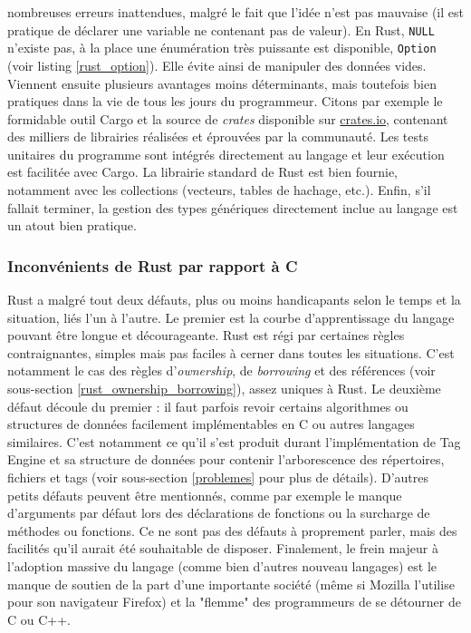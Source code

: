 nombreuses erreurs inattendues, malgré le fait que l'idée n'est pas mauvaise (il est pratique de 
déclarer une variable ne contenant pas de valeur). En Rust, \texttt{NULL} n'existe pas, à la 
place une énumération très puissante est disponible, \texttt{Option} (voir listing \ref{rust_option}).
Elle évite ainsi de manipuler des données vides.
\bigbreak
Viennent ensuite plusieurs avantages moins déterminants, mais toutefois bien pratiques dans la 
vie de tous les jours du programmeur. Citons par exemple le formidable outil Cargo et la source 
de \textit{crates} disponible sur \href{crates.io}{crates.io}, contenant des milliers de librairies 
réalisées et éprouvées par la communauté. Les tests unitaires du programme sont intégrés directement 
au langage et leur exécution est facilitée avec Cargo. La librairie standard de Rust est bien fournie,
notamment avec les collections (vecteurs, tables de hachage, etc.). Enfin, s'il fallait terminer, 
la gestion des types génériques directement inclue au langage est un atout bien pratique.

\subsubsection{Inconvénients de Rust par rapport à C}
Rust a malgré tout deux défauts, plus ou moins handicapants selon le temps et la situation, liés 
l'un à l'autre. Le premier est la courbe d'apprentissage du langage pouvant être longue et décourageante. 
Rust est régi par certaines règles contraignantes, simples mais pas faciles à cerner dans toutes 
les situations. C'est notamment le cas des règles d'\textit{ownership}, de \textit{borrowing} et 
des références (voir sous-section \ref{rust_ownership_borrowing}), assez uniques à Rust. 
Le deuxième défaut découle du premier : il faut parfois revoir certains algorithmes ou structures 
de données facilement implémentables en C ou autres langages similaires. C'est notamment ce qu'il 
s'est produit durant l'implémentation de Tag Engine et sa structure de données pour contenir 
l'arborescence des répertoires, fichiers et tags (voir sous-section \ref{problemes} pour plus de détails).
D'autres petits défauts peuvent être mentionnés, comme par exemple le manque d'arguments par défaut 
lors des déclarations de fonctions ou la surcharge de méthodes ou fonctions. Ce ne sont pas des 
défauts à proprement parler, mais des facilités qu'il aurait été souhaitable de disposer. 
Finalement, le frein majeur à l'adoption massive du langage (comme bien d'autres nouveau langages) 
est le manque de soutien de la part d'une importante société (même si Mozilla l'utilise pour 
son navigateur Firefox) et la "flemme" des programmeurs de se détourner de C ou C++.

